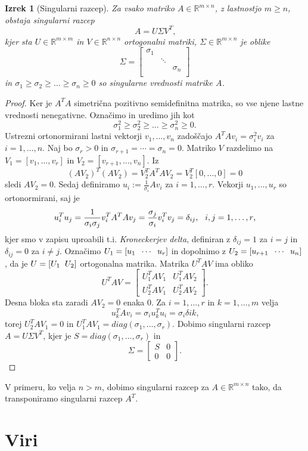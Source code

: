 \documentclass[mat1]{article}
\newtheorem{izrek}{Izrek}
\begin{document}
\begin{izrek}[Singularni razcep]
\label{izrek:SVD} Za vsako matriko $A \in \mathbb{R}^{m \times n}$, z lastnostjo $m \geq n$, obstaja singularni razcep 
$$A = U \Sigma V^T \text{,}$$
kjer sta $U \in \mathbb{R}^{m \times m}$ in $V \in \mathbb{R}^{n \times n}$ ortogonalni matriki, $\Sigma \in \mathbb{R}^{m \times n}$ je oblike
$$
\Sigma = 
\begin{bmatrix} 
\sigma_1 &  & \\
 & \ddots & \\
 & & \sigma_n  \\
 & & 
\end{bmatrix}$$
in $\sigma_1 \geq \sigma_2 \geq \ldots \geq \sigma_n \geq 0$ so singularne vrednosti matrike $A$.
\end{izrek}
\begin{proof}
Ker je $A^TA$ simetrična pozitivno semidefinitna matrika, so vse njene lastne vrednosti nenegativne. Označimo in uredimo jih kot
$$\sigma_1^2 \geq \sigma_2^2 \geq \ldots \geq \sigma_n^2 \geq 0 \text{.}$$
Ustrezni ortonormirani lastni vektorji $v_1, \ldots, v_n$ zadoščajo
$A^T A v_i = \sigma_i^2 v_i$ za $i = 1, \ldots, n \text{.}$
Naj bo $\sigma_r > 0$ in $\sigma_{r+1} = \cdots = \sigma_n = 0 \text{.}$
Matriko $V$ razdelimo na $V_1 = 
\left[ v_1, \ldots, v_r
\right]$ in $V_2 = 
\left[ v_{r+1}, \ldots, v_n
\right] \text{.}$ Iz
$$ (AV_2)^T (AV_2) = V_2^T A^T A V_2 = V_2^T \left[ 0, \ldots, 0 \right] = 0
$$
sledi $AV_2 = 0 \text{.}$ Sedaj definiramo $u_i := \frac{1}{\sigma_i} Av_i$ za $i = 1, \ldots, r \text{.}$
Vekorji $u_1, \ldots, u_r$ so ortonormirani, saj je
$$ u_i^T u_j = \frac{1}{\sigma_i \sigma_j} v_i^T A^T A v_j = \frac{\sigma_j}{\sigma_i} v_i^T v_j = \delta_{ij} \text{,} \hspace{3mm} i,j = 1, \ldots, r \text{,}
$$
kjer smo v zapisu uproabili t.i. \emph{Kroneckerjev delta}, definiran z $\delta_{ij} = 1$ za $i = j$ in $\delta_{ij} = 0$ za $i \neq j$. Označimo 
$U_1 = 
\left[ u_1 \hspace{2mm} \cdots \hspace{2mm} u_r
\right]$ in dopolnimo z $U_2 = 
\left[ u_{r+1} \hspace{2mm} \cdots \hspace{2mm} u_n
\right]$, da je $ U = \left[ U_1 \hspace{2mm} U_2 \right]$ ortogonalna matrika. Matrika $U^T A V$ ima obliko 
$$
U^T A V = 
\begin{bmatrix} 
U_1^T A V_1 & U_1^T A V_2 \\
U_2^T A V_1 & U_2^T A V_2
\end{bmatrix}
\text{.}
$$
Desna bloka sta zaradi $AV_2 = 0$ enaka $0$. Za $i = 1, \ldots, r$ in $k = 1, \ldots, m$ velja
$$ u_k^T A v_i = \sigma_i u_k^T u_i = \sigma_i \delta{ik} \text{,}
$$
torej $U_2^T A V_1 = 0$ in $U_1^T A V_1 = diag(\sigma_1, \ldots, \sigma_r) \text{.}$ Dobimo singularni razcep $A = U \Sigma V^T \text{,}$ kjer je $S = diag(\sigma_1, \ldots, \sigma_r)$ in 
$$ \Sigma = 
\begin{bmatrix} 
S & 0 \\
0 & 0
\end{bmatrix}
\text{.}$$

\end{proof}
V primeru, ko velja $n>m$, dobimo singularni razcep za $A \in \mathbb{R}^{m \times n}$ tako, da transponiramo singularni razcep $A^T$.
\section{Viri}
\end{document}
